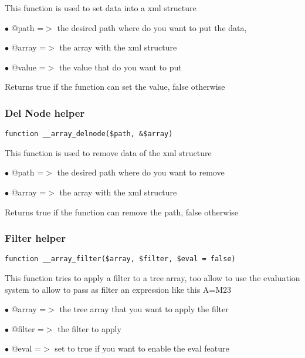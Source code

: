 \documentclass[a4paper]{article}
\begin{document}
This function is used to set data into a xml structure

\begin{compactitem}
\item[\color{myblue}$\bullet$] @path  =$>$ the desired path where do you want to put the data,
\item[\color{myblue}$\bullet$] @array =$>$ the array with the xml structure
\item[\color{myblue}$\bullet$] @value =$>$ the value that do you want to put
\end{compactitem}

Returns true if the function can set the value, false otherwise

\hypertarget{toc57}{}
\subsubsection{Del Node helper}

\begin{lstlisting}
function __array_delnode($path, &$array)
\end{lstlisting}

This function is used to remove data of the xml structure

\begin{compactitem}
\item[\color{myblue}$\bullet$] @path  =$>$ the desired path where do you want to remove
\item[\color{myblue}$\bullet$] @array =$>$ the array with the xml structure
\end{compactitem}

Returns true if the function can remove the path, false otherwise

\hypertarget{toc58}{}
\subsubsection{Filter helper}

\begin{lstlisting}
function __array_filter($array, $filter, $eval = false)
\end{lstlisting}

This function tries to apply a filter to a tree array, too allow to use
the evaluation system to allow to pass as filter an expression like this
A=M23

\begin{compactitem}
\item[\color{myblue}$\bullet$] @array  =$>$ the tree array that you want to apply the filter
\item[\color{myblue}$\bullet$] @filter =$>$ the filter to apply
\item[\color{myblue}$\bullet$] @eval   =$>$ set to true if you want to enable the eval feature
\end{compactitem}
\end{document}

